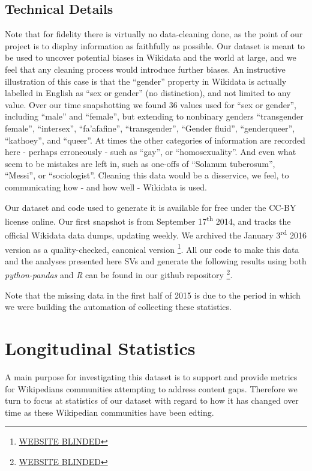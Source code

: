 \documentclass{sig-alternate-05-2015}
\begin{document}
\subsection{Technical Details}

Note that for fidelity there is virtually no data-cleaning done, as the point of our project is to display information as faithfully as possible. Our dataset is meant to be used to uncover potential biases in Wikidata and the world at large, and we feel that any cleaning process would introduce further biases. An instructive illustration of this case is that the ``gender'' property in Wikidata is actually labelled in English  as ``sex or gender'' (no distinction), and not limited to any value. Over our time snapshotting we found 36 values used for ``sex or gender'', including ``male'' and ``female'', but extending to nonbinary genders ``transgender female'', ``intersex'', ``fa'afafine'', ``transgender'', ``Gender fluid'',  ``genderqueer'', ``kathoey'', and ``queer''. At times the other categories of information are recorded here - perhaps erroneously - such as ``gay'', or ``homosexuality''. And even what seem to be mistakes are left in, such as one-offs of ``Solanum tuberosum'', ``Messi'', or ``sociologist''. Cleaning this data would be a disservice, we feel, to communicating how - and how well - Wikidata is used.


Our dataset and code used to generate it is available for free under the CC-BY license online. Our first snapshot is from September 17\textsuperscript{th} 2014, and tracks the official  Wikidata data dumps, updating weekly. We archived the January 3\textsuperscript{rd} 2016 version as a quality-checked, canonical version \footnote{\url{WEBSITE BLINDED}}. All our code to make this data and the analyses presented here SVs and generate the following results using both \textit{python-pandas} and \textit{R} can be found in our github repository \footnote{\url{WEBSITE BLINDED}}.

Note that the missing data in the first half of 2015 is due to  the period in which we were building the automation of collecting these statistics. 


\section{Longitudinal Statistics}
A main purpose for investigating this dataset is to support and provide metrics for Wikipedians communities attempting to  address content gaps. Therefore we turn to focus at statistics of our dataset with regard to how it has changed over time as these Wiki\-pedian communities have been edting. 
\end{document}
